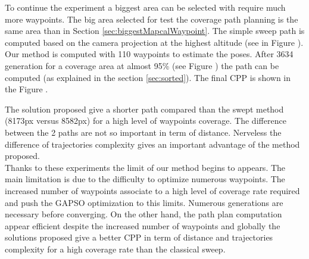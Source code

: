 To continue the experiment a biggest area can be selected with require much more waypoints. The big area selected for test the coverage path planning is the same area than in Section \ref{sec:biggestMapcalWaypoint}. 
The simple sweep path is computed based on the camera projection at the highest altitude (see in Figure ). Our method is computed  with 110 waypoints to estimate the poses. After 3634 generation for a coverage area at almost 95\% (see Figure ) the path  can be computed (as explained in the section \ref{sec:sorted}).  The final CPP is shown in the Figure . 

The solution proposed give a shorter path compared than the swept method (8173px versus 8582px) for a high level of waypoints coverage. The difference between the 2 paths are not so important  %
in term of distance. Nerveless the difference of trajectories complexity gives an important advantage of the method proposed.\\
Thanks to these experiments the limit of our method begins to appears. The main limitation is due to the difficulty to optimize numerous waypoints. %
 The increased number of waypoints associate to a high level of coverage rate required and push the GAPSO optimization to this limits. Numerous generations are necessary before converging. On the other hand, the path plan computation appear efficient despite the increased number of waypoints and globally the solutions proposed give a better CPP in term of distance and trajectories complexity for a high coverage rate than the classical sweep.


 
 
